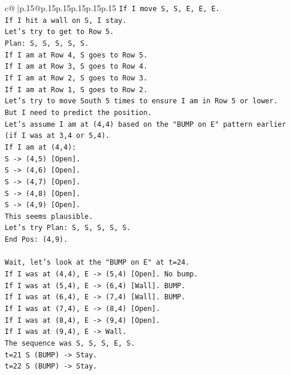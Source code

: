 \documentclass{article}
\begin{document}
{\begin{supertabular}{c@{$\;$}|p{.15\linewidth}@{}p{.15\linewidth}p{.15\linewidth}p{.15\linewidth}p{.15\linewidth}p{.15\linewidth}}
{{{\texttt{If I move S, S, E, E, E.} \\
\texttt{If I hit a wall on S, I stay.} \\
\texttt{Let's try to get to Row 5.} \\
\texttt{Plan: S, S, S, S, S.} \\
\texttt{If I am at Row 4, S goes to Row 5.} \\
\texttt{If I am at Row 3, S goes to Row 4.} \\
\texttt{If I am at Row 2, S goes to Row 3.} \\
\texttt{If I am at Row 1, S goes to Row 2.} \\
\texttt{Let's try to move South 5 times to ensure I am in Row 5 or lower.} \\
\texttt{But I need to predict the position.} \\
\texttt{Let's assume I am at (4,4) based on the "BUMP on E" pattern earlier (if I was at 3,4 or 5,4).} \\
\texttt{If I am at (4,4):} \\
\texttt{S {-}> (4,5) {[}Open{]}.} \\
\texttt{S {-}> (4,6) {[}Open{]}.} \\
\texttt{S {-}> (4,7) {[}Open{]}.} \\
\texttt{S {-}> (4,8) {[}Open{]}.} \\
\texttt{S {-}> (4,9) {[}Open{]}.} \\
\texttt{This seems plausible.} \\
\texttt{Let's try Plan: S, S, S, S, S.} \\
\texttt{End Pos: (4,9).} \\
\\ 
\texttt{Wait, let's look at the "BUMP on E" at t=24.} \\
\texttt{If I was at (4,4), E {-}> (5,4) {[}Open{]}. No bump.} \\
\texttt{If I was at (5,4), E {-}> (6,4) {[}Wall{]}. BUMP.} \\
\texttt{If I was at (6,4), E {-}> (7,4) {[}Wall{]}. BUMP.} \\
\texttt{If I was at (7,4), E {-}> (8,4) {[}Open{]}.} \\
\texttt{If I was at (8,4), E {-}> (9,4) {[}Open{]}.} \\
\texttt{If I was at (9,4), E {-}> Wall.} \\
\texttt{The sequence was S, S, S, E, S.} \\
\texttt{t=21 S (BUMP) {-}> Stay.} \\
\texttt{t=22 S (BUMP) {-}> Stay.} \\
}}}
\end{supertabular}}
\end{document}
